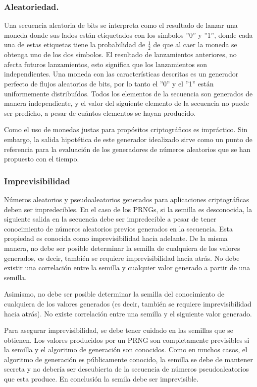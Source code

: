 \documentclass{llncs}
\theoremstyle{plane}
\begin{document}
\subsubsection{Aleatoriedad.}
Una secuencia aleatoria de bits se interpreta como el resultado de lanzar una moneda donde sus lados están etiquetados con los símbolos ''0'' y ''1'', donde cada una de estas etiquetas tiene la probabilidad de $\frac{1}{2}$ de que al caer la moneda se obtenga uno de los dos símbolos. El resultado de lanzamientos anteriores, no afecta futuros lanzamientos, esto significa que los lanzamientos son independientes. Una moneda con las características descritas es un generador perfecto de flujos aleatorios de bits, por lo tanto el ''0'' y el ''1'' están uniformemente distribuídos. Todos los elementos de la secuencia son generados de manera independiente, y el valor del siguiente elemento de la secuencia no puede ser predicho, a pesar de cuántos elementos se hayan producido.  

Como el uso de monedas justas para propósitos criptográficos es impráctico. Sin embargo, la salida hipotética de este generador idealizado sirve como un punto de referencia para la evaluación de los generadores de números aleatorios que se han propuesto con el tiempo.


\subsubsection{Imprevisibilidad}
Números aleatorios y pseudoaleatorios generados para aplicaciones criptográficas deben ser impredecibles. En el caso de los PRNGs, si la semilla es desconocida, la siguiente salida en la secuencia debe ser impredecible a pesar de tener conocimiento de números aleatorios previos generados en la secuencia. Esta propiedad es conocida como imprevisibilidad hacia adelante. De la misma manera, no debe ser posible determinar la semilla de cualquiera de los valores generados, es decir, también se requiere imprevisibilidad hacia atrás. No debe existir una correlación entre la semilla y cualquier valor generado a partir de una semilla. 

Asimismo, no debe ser posible determinar la semilla del conocimiento
de cualquiera de los valores generados (es decir, también se requiere imprevisibilidad hacia atrás). No existe correlación entre una semilla y el siguiente valor generado.

Para asegurar imprevisibilidad, se debe tener cuidado en las semillas que se obtienen. Los valores producidos por un PRNG son completamente previsibles si la semilla y el algoritmo de generación son conocidos. Como en muchos casos, el algoritmo de generación es públicamente conocido, la semilla se debe de mantener secreta y no debería ser descubierta de la secuencia de números pseudoaleatorios que esta produce. En conclusión la semila debe ser imprevisible.
\end{document}
